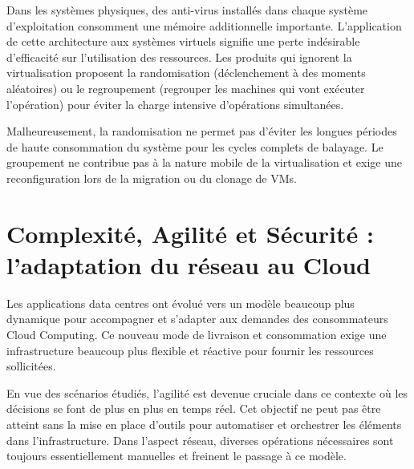 Dans les systèmes physiques, des anti-virus installés dans chaque système d'exploitation consomment une mémoire additionnelle importante. L'application de cette architecture aux systèmes virtuels signifie une perte indésirable d'efficacité sur l'utilisation des ressources. Les produits qui ignorent la virtualisation proposent la randomisation (déclenchement à des moments aléatoires)  ou le regroupement (regrouper les machines qui vont exécuter l'opération) pour éviter la charge intensive d'opérations simultanées.

Malheureusement, la randomisation ne permet pas d'éviter les longues périodes de haute consommation du système pour les cycles complets de balayage. Le groupement ne contribue pas à la nature mobile de la virtualisation et exige une reconfiguration lors de la migration ou du clonage de VMs. 
\cite{hpAlcatelCreatinCloudDCchallenges} \cite{cloudSecurityThreats}


\section{Complexité, Agilité et Sécurité : l'adaptation du réseau au Cloud}

Les applications data centres ont évolué vers un modèle beaucoup plus dynamique pour accompagner et s'adapter aux demandes des consommateurs Cloud Computing. Ce nouveau mode de livraison et consommation exige une infrastructure beaucoup plus flexible et réactive pour fournir les ressources sollicitées. 

En vue des scénarios étudiés, l'agilité est devenue cruciale dans ce contexte où les décisions se font de plus en plus en temps réel. Cet objectif ne peut pas être atteint sans la mise en place d'outils pour automatiser et orchestrer les éléments dans l'infrastructure. Dans l'aspect réseau, diverses opérations nécessaires sont toujours essentiellement manuelles et freinent le passage à ce modèle.

